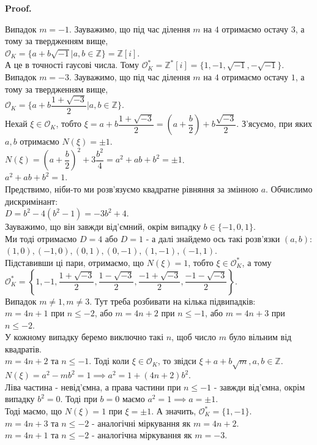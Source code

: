 \documentclass[a4paper, 14pt]{extarticle}
\makeatletter
\theoremstyle{theoremdd}
\theoremstyle{theoremdd}
\theoremstyle{theoremdd}
\theoremstyle{theoremdd}
\theoremstyle{theoremdd}
\theoremstyle{theoremdd}
\theoremstyle{theoremdd}
\theoremstyle{theoremdd}
\def\qed{$\blacksquare$}
\renewenvironment{proof}[1][Proof.\\]{\par
\pushQED{\hfill \qed}%
\normalfont \topsep6\p@\@plus6\p@\relax
\trivlist
\item\relax
{\bfseries
#1\@addpunct{.}}\hspace\labelsep\ignorespaces
}{%
\popQED\endtrivlist\@endpefalse
}
\makeatother
\begin{document}
\begin{proof}
Випадок $m=-1$. Зауважимо, що під час ділення $m$ на $4$ отримаємо остачу $3$, а тому за твердженням вище,\\
$\mathcal{O}_K = \{a+b\sqrt{-1} |a,b \in \mathbb{Z}\} = \mathbb{Z}[i]$.\\
А це в точності гаусові числа. Тому $\mathcal{O}_K^* = \mathbb{Z}^*[i] = \{1,-1, \sqrt{-1}, -\sqrt{-1}\}$.
\bigskip \\
Випадок $m = -3$. Зауважимо, що під час ділення $m$ на $4$ отримаємо остачу $1$, а тому за твердженням вище,\\
$\mathcal{O}_K = \{a+b \dfrac{1+\sqrt{-3}}{2} |a,b \in \mathbb{Z}\}$.\\
Нехай $\xi \in \mathcal{O}_K$, тобто $\xi = a + b \dfrac{1+\sqrt{-3}}{2} = \left( a + \dfrac{b}{2} \right) + b \dfrac{\sqrt{-3}}{2}$. З'ясуємо, при яких $a,b$ отримаємо $N(\xi) = \pm 1$.\\
$N(\xi) = \left( a + \dfrac{b}{2} \right)^2 + 3 \dfrac{b^2}{4} = a^2 + ab + b^2 = \pm 1$.\\
$a^2 + ab + b^2 = 1$.\\
Предствимо, ніби-то ми розв'язуємо квадратне рівняння за змінною $a$. Обчислимо дискримінант:\\
$D = b^2 - 4(b^2-1) = -3b^2+4$.\\
Зауважимо, що він завжди від'ємний, окрім випадку $b \in \{-1,0,1\}$.\\
Ми тоді отримаємо $D = 4$ або $D = 1$ - а далі знайдемо ось такі розв'язки $(a,b)$:\\
$(1,0), (-1,0), (0,1), (0,-1), (1,-1), (-1,1)$.\\
Підставивши ці пари, отримаємо, що $N(\xi) = 1$, тобто $\xi \in \mathcal{O}^*_K$, а тому\\
$\mathcal{O}^*_K = \left\{ 1,-1,\dfrac{1+\sqrt{-3}}{2},\dfrac{1-\sqrt{-3}}{2},\dfrac{-1+\sqrt{-3}}{2}, \dfrac{-1-\sqrt{-3}}{2} \right\}$.
\bigskip \\
Випадок $m \neq 1, m \neq 3$. Тут треба розбивати на кілька підвипадків: \\
$m = 4n+1$ при $n \leq -2$, або $m = 4n+2$ при $n \leq -1$, або $m = 4n+3$ при $n \leq -2$.\\
У кожному випадку беремо виключно такі $n$, щоб число $m$ було вільним від квадратів.\\
$m = 4n+2$ та $n \leq -1$. Тоді коли $\xi \in \mathcal{O}_K$, то звідси $\xi + a + b\sqrt{m}, a,b \in \mathbb{Z}$.\\
$N(\xi) = a^2 -mb^2 = 1 \implies a^2 = 1 + (4n+2)b^2$.\\
Ліва частина - невід'ємна, а права частини при $n \leq -1$ - завжди від'ємна, окрім випадку $b^2 = 0$. Тоді при $b=0$ маємо $a^2 = 1 \implies a = \pm 1$.\\
Тоді маємо, що $N(\xi) = 1$ при $\xi = \pm 1$. А значить, $\mathcal{O}^*_K = \{1,-1\}$.
\bigskip \\
$m = 4n+3$ та $n \leq -2$ - аналогічні міркування як $m=4n+2$.
\bigskip \\
$m = 4n+1$ та $n \leq -2$ - аналогічна міркування як $m = -3$.
\end{proof}
\end{document}
